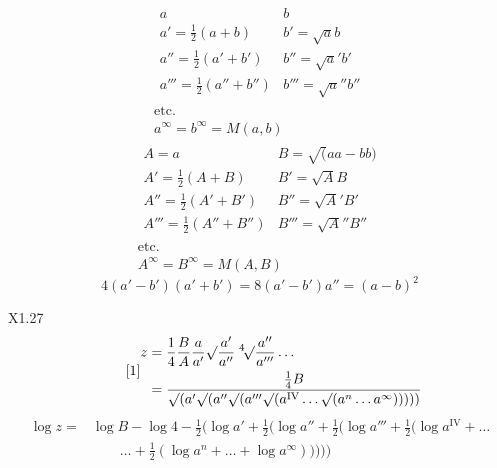 \begingroup
\makeatletter\tagsleft@true\let\veqno\@@leqno\makeatother
\clearpage{}\NoSourceHead
{}
\noindent [S.\ 11]
\[\boxed{\begin{gathered}
\begin{array}{ll}
a&b\\[.3em]
a'=\frac12(a+b)&b'=\surd ab\\[.3em]
a''=\frac12(a'+b')&b''=\surd a'b'\\[.3em]
a'''=\frac12(a''+b'')&b'''=\surd a''b''
\end{array}\\
\text{etc.}\\[.3em]
a^\infty=b^\infty=M(a,b)
\end{gathered}}\]
\[\boxed{\begin{gathered}
\begin{array}{ll}
A=a&B=\surd(aa-bb)\\[.3em]
A'=\frac12(A+B)&B'=\surd AB\\[.3em]
A''=\frac12(A'+B')&B''=\surd A'B'\\[.3em]
A'''=\frac12(A''+B'')&B'''=\surd A''B''
\end{array}\\
\text{etc.}\\[.3em]
A^\infty=B^\infty=M(A,B)
\end{gathered}}\]
\[\boxed{4(a'-b')(a'+b')=8(a'-b')a''=(a-b)^2}\]
\par\noindent X1.\hfill27
\clearpage{}
{\small
\begin{equation*}\tag*{[1]}
\begin{aligned}
z&=\frac14\frac BA\frac a{a'}\surd\frac{a'}{a''}\;{}^4\!\surd\frac{a''}{a'''}\ldots\\
&=\frac{\frac14B}{\surd(a'\surd(a''\surd(a'''\surd(a^{\mathrm{IV}}\ldots\surd(a^n\ldots a^\infty)))))}
\end{aligned}
\end{equation*}
\[\begin{aligned}
\log z={}&\log B-\log4-\tfrac12(\log a'+\tfrac12(\log a''+\tfrac12(\log a'''+\tfrac12(\log a^{\mathrm{IV}}+\ldots\\
&\qquad\ldots+\tfrac12(\log a^n+\ldots+\log a^\infty)))))
\end{aligned}\]}
